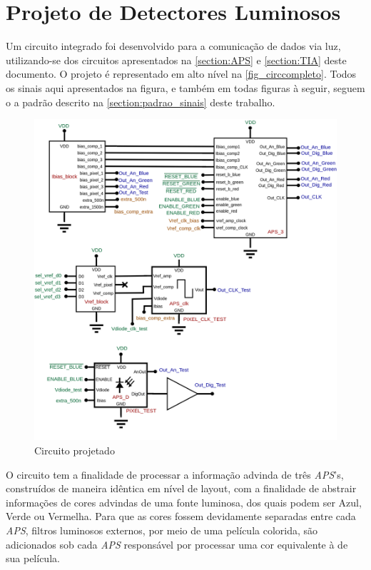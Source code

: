 \section[Projeto de Detectores Luminosos]{Projeto de Detectores Luminosos}
\label{sec_circ_comp}

Um circuito integrado foi desenvolvido para a comunicação de dados via luz, utilizando-se dos circuitos apresentados na \autoref{section:APS} e \autoref{section:TIA} deste documento. O projeto \'e representado em alto n\'ivel na \autoref{fig_circcompleto}. Todos os sinais aqui apresentados na figura, e tamb\'em em todas figuras \`a seguir, seguem o a padr\~ao descrito na \autoref{section:padrao_sinais} deste trabalho.

\begin{figure}[htb]
	\caption{\label{fig_circcompleto}Circuito projetado}
	\begin{center}
	    \includegraphics[width=\textwidth]{Circuitos/Complete_Circuit.png}
	\end{center}
\end{figure}

O circuito tem a finalidade de processar a informa{\c c}\~ao advinda de tr\^es \emph{APS}'s, constru\'idos de maneira id\^entica em n\'ivel de layout, com a finalidade de abstrair informa{\c c}\~oes de cores advindas de uma fonte luminosa, dos quais podem ser Azul, Verde ou Vermelha. Para que as cores fossem devidamente separadas entre cada \emph{APS}, filtros luminosos externos, por meio de uma pel\'icula colorida, s\~ao adicionados sob cada \emph{APS} respons\'avel por processar uma cor equivalente \`a de sua pel\'icula.

